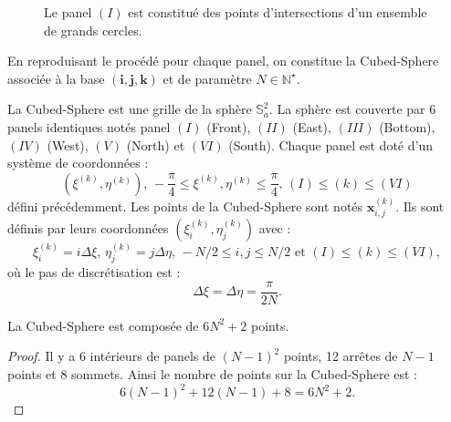 \begin{figure}[htbp]
\begin{center}
\end{center}
\caption{Le panel $(I)$ est constitué des points d'intersections d'un ensemble de grands cercles.}
\label{fig: panel I}
\end{figure}  

En reproduisant le procédé pour chaque panel, on constitue la Cubed-Sphere associée à la base $(\mathbf{i},\mathbf{j},\mathbf{k})$ et de paramètre $N \in \mathbb{N}^{\star}$.

\begin{definition}
La Cubed-Sphere est une grille de la sphère $\mathbb{S}_a^2$. La sphère est couverte par 6 panels identiques notés panel $(I)$ (Front), $(II)$ (East), $(III)$ (Bottom), $(IV)$ (West), $(V)$ (North) et $(VI)$ (South). Chaque panel est doté d'un système de coordonnées :
\begin{equation}
\left( \xi^{(k)}, \eta^{(k)} \right) \text{, } -\dfrac{\pi}{4} \leq \xi^{(k)}, \eta^{(k)} \leq \dfrac{\pi}{4} \text{, } (I) \leq (k) \leq (VI)
\end{equation}
défini précédemment. Les points de la Cubed-Sphere sont notés $\mathbf{x}_{i,j}^{(k)}$. Ils sont définis par leurs coordonnées $\left( \xi_i^{(k)}, \eta_j^{(k)}  \right)$ avec :
\begin{equation}
\xi_i^{(k)} = i \Delta \xi \text{, } \eta_j^{(k)} = j \Delta \eta \text{, } -N/2 \leq i, j \leq N/2 \text{ et } (I) \leq (k) \leq (VI),
\end{equation}
où le pas de discrétisation est :
\begin{equation}
\Delta \xi = \Delta \eta = \dfrac{\pi}{2 N}.
\end{equation}
\end{definition}

\begin{proposition}
La Cubed-Sphere est composée de $6N^2 +2$ points.
\end{proposition}

\begin{proof}
Il y a 6 intérieurs de panels de $(N-1)^2$ points, 12 arrêtes de $N-1$ points et 8 sommets. Ainsi le nombre de points sur la Cubed-Sphere est :
\begin{equation}
6 (N-1)^2 + 12 (N-1)+8=6N^2+2.
\end{equation}
\end{proof}

